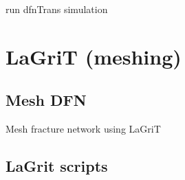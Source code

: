 \documentclass[letterpaper,10pt,english]{sphinxmanual}
\begin{document}

\begin{fulllineitems}
\label{\detokenize{pydfnworks:pydfnworks.transport.run_dfn_trans}}
run dfnTrans simulation

\end{fulllineitems}



\section{LaGriT (meshing)}
\label{\detokenize{pydfnworks:lagrit-meshing}}

\subsection{Mesh DFN}
\label{\detokenize{pydfnworks:module-pydfnworks.meshdfn}}\label{\detokenize{pydfnworks:mesh-dfn}}\label{\detokenize{pydfnworks:module-meshdfn.py}}

\begin{fulllineitems}
\label{\detokenize{pydfnworks:pydfnworks.meshdfn.mesh_network}}
Mesh fracture network using LaGriT

\end{fulllineitems}



\subsection{LaGrit scripts}
\label{\detokenize{pydfnworks:lagrit-scripts}}\label{\detokenize{pydfnworks:module-pydfnworks.lagrit_scripts}}\label{\detokenize{pydfnworks:module-lagrit_scripts.py}}
\end{document}
